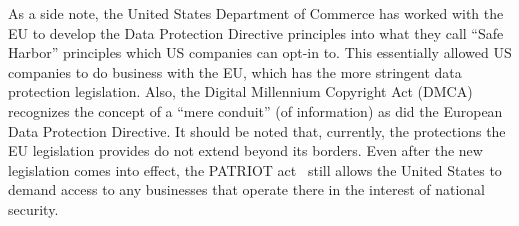 \documentclass[11pt, a4paper]{article}
\begin{document}
As a side note, the United States Department of Commerce has worked with the EU to develop the Data Protection Directive principles into what they call ``Safe Harbor'' principles which US companies can opt-in to.
This essentially allowed US companies to do business with the EU, which has the more stringent data protection legislation.
Also, the Digital Millennium Copyright Act (DMCA) recognizes the concept of a ``mere conduit'' (of information) as did the European Data Protection Directive. \cite{congress1998digital}
It should be noted that, currently, the protections the EU legislation provides do not extend beyond its borders.
Even after the new legislation comes into effect, the PATRIOT act~\cite{mailman2002uniting} still allows the United States to demand access to any businesses that operate there in the interest of national security.









\end{document}
